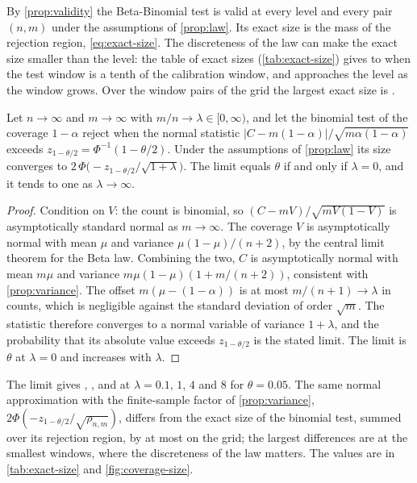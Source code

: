 By \cref{prop:validity} the Beta-Binomial test is valid at every level and every pair $(n,m)$ under the assumptions of \cref{prop:law}. Its exact size is the mass of the rejection region, \cref{eq:exact-size}. The discreteness of the law can make the exact size smaller than the level: the table of exact sizes (\cref{tab:exact-size}) gives \CovExBBMinTenth{} to \CovExBBMaxTenth{} when the test window is a tenth of the calibration window, and approaches the level as the window grows. Over the \CovGridCells{} window pairs of the grid the largest exact size is \CovBBMaxExact{}.

\begin{proposition}
\label{prop:binomial-size}
Let $n\to\infty$ and $m\to\infty$ with $m/n\to\lambda\in[0,\infty)$, and let the binomial test of the coverage $1-\alpha$ reject when the normal statistic $|C-m(1-\alpha)|/\sqrt{m\alpha(1-\alpha)}$ exceeds $z_{1-\theta/2}=\Phi^{-1}(1-\theta/2)$. Under the assumptions of \cref{prop:law} its size converges to $2\,\Phi\bigl(-z_{1-\theta/2}/\sqrt{1+\lambda}\bigr)$. The limit equals $\theta$ if and only if $\lambda=0$, and it tends to one as $\lambda\to\infty$.
\end{proposition}
\begin{proof}
Condition on $V$: the count is binomial, so $(C-mV)/\sqrt{mV(1-V)}$ is asymptotically standard normal as $m\to\infty$. The coverage $V$ is asymptotically normal with mean $\mu$ and variance $\mu(1-\mu)/(n+2)$, by the central limit theorem for the Beta law. Combining the two, $C$ is asymptotically normal with mean $m\mu$ and variance $m\mu(1-\mu)(1+m/(n+2))$, consistent with \cref{prop:variance}. The offset $m(\mu-(1-\alpha))$ is at most $m/(n+1)\to\lambda$ in counts, which is negligible against the standard deviation of order $\sqrt m$. The statistic therefore converges to a normal variable of variance $1+\lambda$, and the probability that its absolute value exceeds $z_{1-\theta/2}$ is the stated limit. The limit is $\theta$ at $\lambda=0$ and increases with $\lambda$.
\end{proof}

The limit gives \LimBinTenth{}, \LimBinOne{}, \LimBinFour{} and \LimBinEight{} at $\lambda=0.1$, $1$, $4$ and $8$ for $\theta=0.05$. The same normal approximation with the finite-sample factor of \cref{prop:variance}, $2\Phi(-z_{1-\theta/2}/\sqrt{\rho_{n,m}})$, differs from the exact size of the binomial test, summed over its rejection region, by at most \CovNormalMaxErr{} on the grid; the largest differences are at the smallest windows, where the discreteness of the law matters. The values are in \cref{tab:exact-size} and \cref{fig:coverage-size}.

